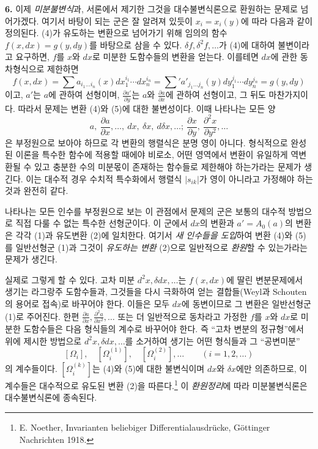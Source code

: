 \textbf{6.} 이제 \emph{미분불변식}과, 서론에서 제기한 그것을 대수불변식론으로 환원하는 문제로 넘어가겠다. 여기서 바탕이 되는 군은 잘 알려져 있듯이 $x_i=x_i(y)$에 따라 다음과 같이 정의된다.
(4)가 유도하는 변환으로 넘어가기 위해 임의의 함수 $f(x,d x)=g(y,d y)$를 바탕으로 삼을 수 있다. $\delta f,\delta^2f,\ldots$가 (4)에 대하여 불변이라고 요구하면, $f$를 $x$와 $d x$로 미분한 도함수들의 변환을 얻는다. 이를테면 $d x$에 관한 동차형식으로 제한하면
\[
 f(x,d x)=\sum a_{i_1\ldots i_n}(x)d x_1^{i_1}\cdots d x_n^{i_n}
 =\sum{}' a'_{j_1\ldots j_n}(y)d y_1^{j_1}\cdots d y_n^{j_n}
 =g(y,d y)
\]
이고, $a'$는 $a$에 관하여 선형이며, $\frac{\partial a'}{\partial y}$는 $a$와 $\frac{\partial a}{\partial x}$에 관하여 선형이고, 그 뒤도 마찬가지이다.
따라서 문제는 변환 (4)와 (5)에 대한 불변성이다. 이때 나타나는 모든 양
\[
a,\ \frac{\partial a}{\partial x},\ldots,\ d x,\ \delta x,\ d\delta x,\ldots;\ 
\frac{\partial x}{\partial y},\ \frac{\partial^2 x}{\partial y^2},\ldots
\]
은 부정원으로 보아야 하므로 각 변환의 행렬식은 분명 영이 아니다. 형식적으로 완성된 이론을 특수한 함수에 적용할 때에야 비로소, 어떤 영역에서 변환이 유일하게 역변환될 수 있고 충분한 수의 미분몫이 존재하는 함수들로 제한해야 하는가라는 문제가 생긴다. 이는 대수적 경우 수치적 특수화에서 행렬식 $|s_{ik}|$가 영이 아니라고 가정해야 하는 것과 완전히 같다.

나타나는 모든 인수를 부정원으로 보는 이 관점에서 문제의 군은 보통의 대수적 방법으로 직접 다룰 수 없는 특수한 선형군이다. 이 군에서 $d x$의 변환과 $a'=A_0(a)$의 변환은 각각 (1)과 유도변환 (2)에 일치한다. 여기서 \emph{새 인수들을 도입}하여 변환 (4)와 (5)를 일반선형군 (1)과 그것이 \emph{유도하는 변환} (2)으로 일반적으로 \emph{환원}할 수 있는가라는 문제가 생긴다.

실제로 그렇게 할 수 있다. 고차 미분 $d^2x,\delta d x,\ldots$는 $f(x,d x)$에 딸린 변분문제에서 생기는 라그랑주 도함수들과, 그것들을 다시 극화하여 얻는 결합들(Weyl과 Schouten의 용어로 접속)로 바꾸어야 한다. 이들은 모두 $d x$에 동변이므로 그 변환은 일반선형군 (1)로 주어진다. 한편 $\frac{\partial a}{\partial x},\frac{\partial^2a}{\partial x^2},\ldots$ 또는 더 일반적으로 동차라고 가정한 $f$를 $x$와 $d x$로 미분한 도함수들은 다음 형식들의 계수로 바꾸어야 한다. 즉 ``고차 변분의 정규형''에서 위에 제시한 방법으로 $d^2x,\delta d x,\ldots$를 소거하여 생기는 어떤 형식들과 그 ``공변미분''
\[
 [\Omega_i],\quad [\Omega_i^{(1)}],\quad [\Omega_i^{(2)}],\ldots\qquad (i=1,2,\ldots)
\]
의 계수들이다. $[\Omega_i^{(k)}]$는 (4)와 (5)에 대한 불변식이며 $d x$와 $\delta x$에만 의존하므로, 이 계수들은 대수적으로 유도된 변환 (2)을 따른다.\footnote{E. Noether, Invarianten beliebiger Differentialausdrücke, Göttinger Nachrichten 1918.} 이 \emph{환원정리}에 따라 미분불변식론은 대수불변식론에 종속된다.

